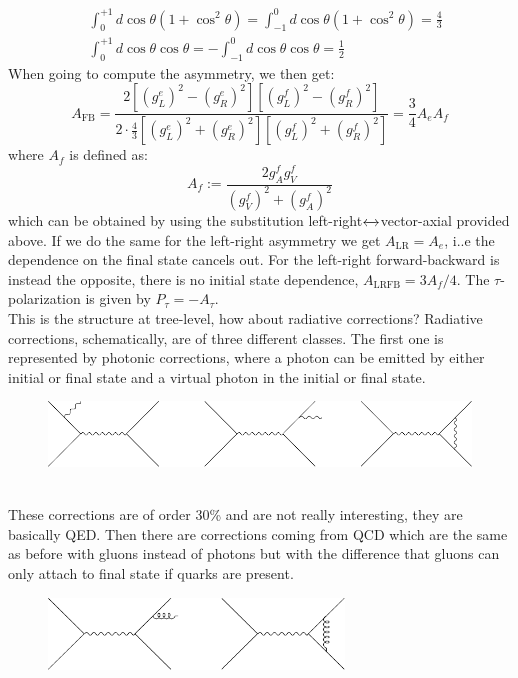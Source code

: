 \documentclass[../main.tex]{subfiles}
\begin{document}
\begin{align*}
&\int_0^{+1}d\cos\theta(1+\cos^2\theta)=\int_{-1}^0d\cos\theta(1+\cos^2\theta)=\frac{4}{3}\\
&\int_0^{+1}d\cos\theta\cos\theta=-\int_{-1}^0d\cos\theta\cos\theta=\frac{1}{2}
\end{align*}
When going to compute the asymmetry, we then get:
\[
A_{\text{FB}}=\frac{2[(g_L^e)^2-(g_R^e)^2][(g_L^f)^2-(g_R^f)^2]}{2\cdot\frac{4}{3}[(g_L^e)^2+(g_R^e)^2][(g_L^f)^2+(g_R^f)^2]}=\frac{3}{4}A_eA_f
\]
where $A_f$ is defined as:
\[
A_f:=\frac{2g_A^fg_V^f}{(g_V^f)^2+(g_A^f)^2}
\]
which can be obtained by using the substitution left-right$\xleftrightarrow[]{}$vector-axial provided above. If we do the same for the left-right asymmetry we get $A_{\text{LR}}=A_e$, i..e the dependence on the final state cancels out. For the left-right forward-backward is instead the opposite, there is no initial state dependence, $A_{\text{LRFB}}=3A_f/4$. The $\tau$-polarization is given by $P_\tau=-A_\tau$.\\
This is the structure at tree-level, how about radiative corrections? Radiative corrections, schematically, are of three different classes.
The first one is represented by photonic corrections, where a photon can be emitted by either initial or final state and a virtual photon in the initial or final state.
\begin{figure}[h]
    \centering
    \includegraphics{Images/corr1.pdf}
    \caption*{}
\end{figure}\\
These corrections are of order 30\% and are not really interesting, they are basically QED. Then there are corrections coming from QCD which are the same as before with gluons instead of photons but with the difference that gluons can only attach to final state if quarks are present.
\begin{figure}[h]
    \centering
    \includegraphics[width=0.7\textwidth]{Images/corr2.pdf}
    \caption*{}
\end{figure}\\
\end{document}
